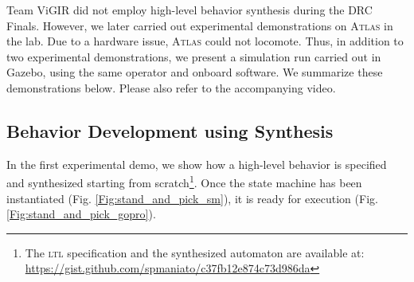 

Team ViGIR did not employ high-level behavior synthesis during the DRC Finals.
However, we later carried out experimental demonstrations on \textsc{Atlas} in the lab.
Due to a hardware issue, \textsc{Atlas} could not locomote.
Thus, in addition to two experimental demonstrations, we present a simulation run carried out in Gazebo, using the same operator and onboard software.
We summarize these demonstrations below.
Please also refer to the accompanying video.

\subsection{Behavior Development using Synthesis}\label{S:SynthesisFromScratch}

In the first experimental demo, we show how a high-level behavior is specified and synthesized starting from scratch\footnote{The \textsc{ltl} specification and the synthesized automaton are available at: \scriptsize{\url{https://gist.github.com/spmaniato/c37fb12e874c73d986da}}}.
Once the state machine has been instantiated (Fig. \ref{Fig:stand_and_pick_sm}), it is ready for execution (Fig. \ref{Fig:stand_and_pick_gopro}).

